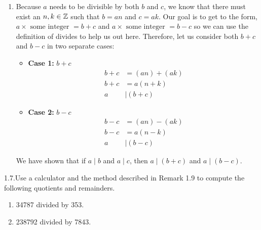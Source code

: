 {\begin{enumerate}
\begin{itemize}
\begin{itemize}
            \end{itemize}
            \item \textbf{Case 2:} $a = 0$ \\
            If $a = 0$, then $b = 0 \times n = 0$ and $0 = b \times k = 0$. Therefore, $a = b = 0$, and $a = \pm b$ is still true.
        \end{itemize}
        We have shown that in either case if $a \mid b$ and $b \mid a$, then $a = \pm b$.
        \item Because $a$ needs to be divisible by both $b$ and $c$, we know that there must exist an $n,k \in \mathbb{Z}$ such that $b = an$ and $c = ak$. Our goal is to get to the form, $a \times \text{ some integer } = b + c$ and $a \times \text{ some integer } = b - c$ so we can use the definition of divides to help us out here. Therefore, let us consider both $b + c$ and $b - c$ in two separate cases:
        \begin{itemize}
            \item \textbf{Case 1:} $b + c$
            \begin{align*}
                b + c &= (an) + (ak) \\
                b + c &= a(n + k) \\
                a &\mid (b + c) 
            \end{align*}
            \item \textbf{Case 2:} $b - c$
            \begin{align*}
                b - c &= (an) - (ak) \\
                b - c &= a(n - k) \\
                a &\mid (b - c) 
            \end{align*}
        \end{itemize}
        We have shown that if $a \mid b$ and $a \mid c$, then $a \mid (b + c)$ and $a \mid (b - c)$.
    \end{enumerate}
}

\begin{exercise}
    {1.7.}Use a calculator and the method described in Remark 1.9 to compute the following quotients and remainders.
    \begin{enumerate}
        \item 34787 divided by 353.
        \item 238792 divided by 7843.
    \end{enumerate}
\end{exercise}

